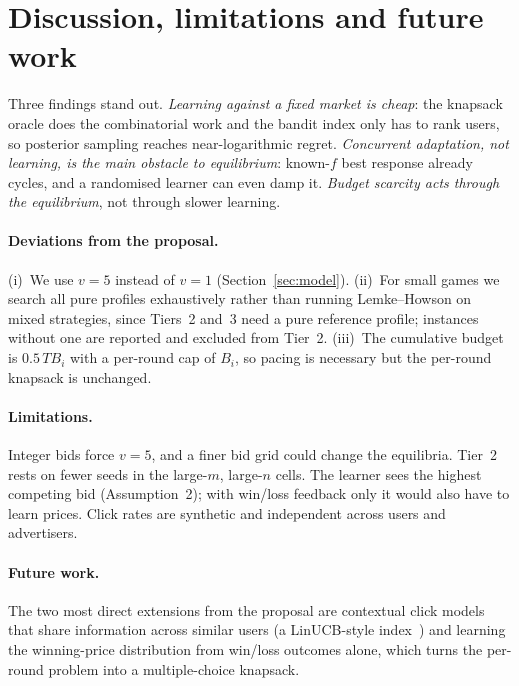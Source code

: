 \documentclass{article}
\theoremstyle{definition}
\begin{document}
\section{Discussion, limitations and future work}\label{sec:discussion}
Three findings stand out. \emph{Learning against a fixed market is cheap}: the knapsack oracle does the
combinatorial work and the bandit index only has to rank users, so posterior sampling reaches near-logarithmic
regret. \emph{Concurrent adaptation, not learning, is the main obstacle to equilibrium}: known-$f$ best
response already cycles, and a randomised learner can even damp it. \emph{Budget scarcity acts through the
equilibrium}, not through slower learning.

\paragraph{Deviations from the proposal.} (i)~We use $v=5$ instead of $v=1$ (Section~\ref{sec:model}).
(ii)~For small games we search all pure profiles exhaustively rather than running Lemke--Howson on mixed
strategies, since Tiers~2 and~3 need a pure reference profile; instances without one are reported and
excluded from Tier~2. (iii)~The cumulative budget is $0.5\,TB_i$ with a per-round cap of $B_i$, so pacing is
necessary but the per-round knapsack is unchanged.

\paragraph{Limitations.} Integer bids force $v=5$, and a finer bid grid could change the equilibria. Tier~2
rests on fewer seeds in the large-$m$, large-$n$ cells. The learner sees the highest competing bid
(Assumption~2); with win/loss feedback only it would also have to learn prices. Click rates are synthetic and
independent across users and advertisers.

\paragraph{Future work.} The two most direct extensions from the proposal are contextual click models that
share information across similar users (a LinUCB-style index~\citep{li2010contextual}) and learning the
winning-price distribution from win/loss outcomes alone, which turns the per-round problem into a
multiple-choice knapsack.
\end{document}
